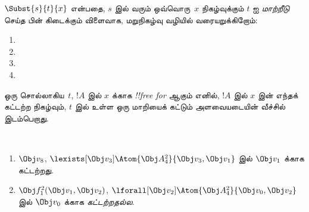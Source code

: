 \documentclass[../../../include/open-logic-section]{subfiles}
\begin{document}


\begin{defn}[ஒரு சொல்லில் மாற்றீடு]
$\Subst{s}{t}{x}$ என்பதை, $s$ இல் வரும் ஒவ்வொரு~$x$ நிகழ்வுக்கும் $t$ ஐ
\emph{மாற்றீடு} செய்த பின் கிடைக்கும் விளைவாக, மறுநிகழ்வு வழியில்
வரையறுக்கிறோம்:
\begin{enumerate}
\item {}

\item {}

\item {}

\item{}
\end{enumerate}
\end{defn}

\begin{defn}
ஒரு சொல்லாகிய~$t$, $!A$ இல் $x$ க்காக \emph{!!{free for}} ஆகும் எனில்,
$!A$ இல் $x$ இன் எந்தக் கட்டற்ற நிகழ்வும், $t$ இல் உள்ள ஒரு மாறியைக்
கட்டும் அளவையடையின் வீச்சில் இடம்பெறாது.
\end{defn}

\begin{ex} ~
\begin{enumerate}
\item $\Obj v_8$, $\lexists[\Obj
  v_3]\Atom{\Obj A^2_4}{\Obj v_3,\Obj v_1}$ இல் $\Obj v_1$ க்காக
  கட்டற்றது.

\item $\Obj f^2_1(\Obj v_1, \Obj v_2)$, $\lforall[\Obj v_2]\Atom{\Obj A^2_4}{\Obj v_0,\Obj v_2}$
  இல் $\Obj v_0$ க்காக \emph{கட்டற்றதல்ல}.
\end{enumerate}
\end{ex}
\end{document}
